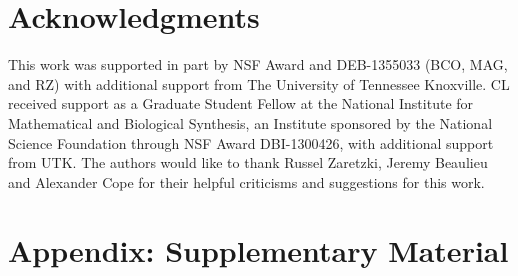 \section{Acknowledgments}

This work was supported in part by NSF Award and DEB-1355033 (BCO, MAG, and RZ) with additional support from The University of Tennessee Knoxville. 
CL received support as a Graduate Student Fellow at the National Institute for Mathematical and Biological Synthesis, an Institute sponsored by the National Science Foundation through NSF Award DBI-1300426, with additional support from UTK. 
The authors would like to thank Russel Zaretzki, Jeremy Beaulieu and Alexander Cope for their helpful criticisms and suggestions for this work.




%
%

\clearpage
\section{Appendix: Supplementary Material}

